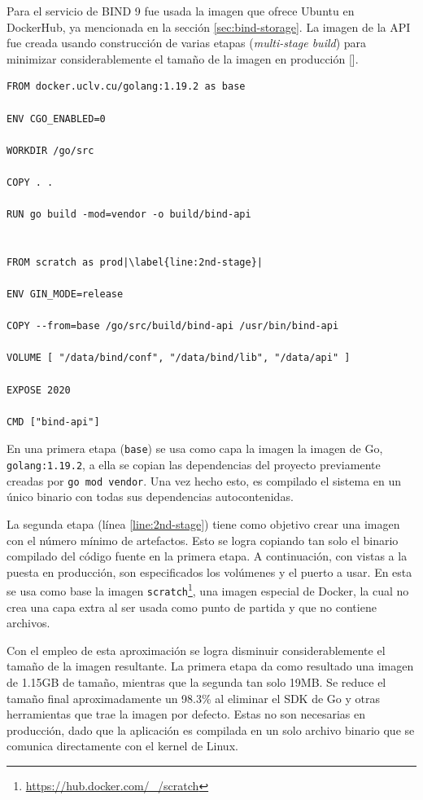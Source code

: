 Para el servicio de BIND 9 fue usada la imagen que ofrece Ubuntu en DockerHub, ya mencionada en la sección \ref{sec:bind-storage}. La imagen de la API fue creada usando construcción de varias etapas (\textit{multi-stage build}) para minimizar considerablemente el tamaño de la imagen en producción [\cite{multi-stage}].

\begin{lstlisting}[frame=single, escapechar=|, caption=Dockerfile para la API.]
FROM docker.uclv.cu/golang:1.19.2 as base

ENV CGO_ENABLED=0

WORKDIR /go/src

COPY . .

RUN go build -mod=vendor -o build/bind-api
    

FROM scratch as prod|\label{line:2nd-stage}|

ENV GIN_MODE=release

COPY --from=base /go/src/build/bind-api /usr/bin/bind-api

VOLUME [ "/data/bind/conf", "/data/bind/lib", "/data/api" ]

EXPOSE 2020

CMD ["bind-api"]
\end{lstlisting}

En una primera etapa (\verb|base|) se usa como capa la imagen la imagen de Go, \verb|golang:1.19.2|, a ella se copian las dependencias del proyecto previamente creadas por \verb|go mod vendor|. Una vez hecho esto, es compilado el sistema en un único binario con todas sus dependencias autocontenidas.

La segunda etapa (línea \ref{line:2nd-stage}) tiene como objetivo crear una imagen con el número mínimo de artefactos. Esto se logra copiando tan solo el binario compilado del código fuente en la primera etapa. A continuación, con vistas a la puesta en producción, son especificados los volúmenes y el puerto a usar. En esta se usa como base la imagen \verb|scratch|\footnote{\url{https://hub.docker.com/_/scratch}}, una imagen especial de Docker, la cual no crea una capa extra al ser usada como punto de partida y que no contiene archivos.

Con el empleo de esta aproximación se logra disminuir considerablemente el tamaño de la imagen resultante. La primera etapa da como resultado una imagen de 1.15GB de tamaño, mientras que la segunda tan solo 19MB. Se reduce el tamaño final aproximadamente un 98.3\% al eliminar el SDK de Go y otras herramientas que trae la imagen por defecto. Estas no son necesarias en producción, dado que la aplicación es compilada en un solo archivo binario que se comunica directamente con el kernel de Linux.

